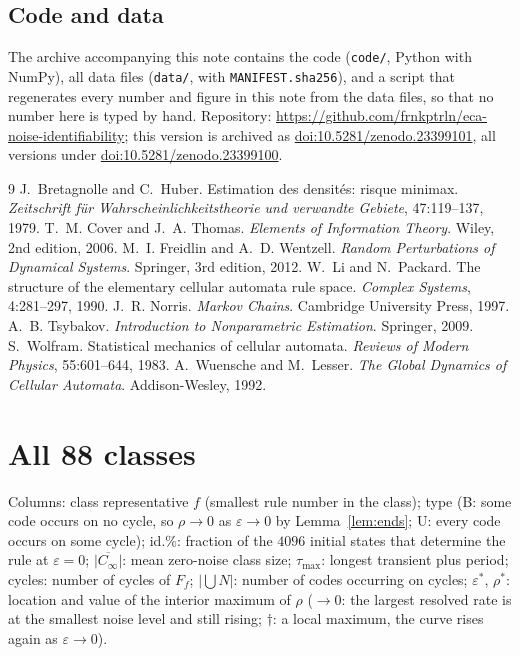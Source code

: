 \documentclass[11pt,a4paper]{article}
\theoremstyle{remark}
\newcommand{\eps}{\varepsilon}
\begin{document}
\subsection*{Code and data}
The archive accompanying this note contains the code (\texttt{code/}, Python with NumPy), all data files (\texttt{data/}, with \texttt{MANIFEST.sha256}), and a script that regenerates every number and figure in this note from the data files, so that no number here is typed by hand. Repository: \url{https://github.com/frnkptrln/eca-noise-identifiability}; this version is archived as \href{https://doi.org/10.5281/zenodo.23399101}{doi:10.5281/zenodo.23399101}, all versions under \href{https://doi.org/10.5281/zenodo.23399100}{doi:10.5281/zenodo.23399100}.

\begin{thebibliography}{9}\small
{} J.~Bretagnolle and C.~Huber. Estimation des densit\'es: risque minimax. \emph{Zeitschrift f\"ur Wahrscheinlichkeitstheorie und verwandte Gebiete}, 47:119--137, 1979.
 T.~M. Cover and J.~A. Thomas. \emph{Elements of Information Theory}. Wiley, 2nd edition, 2006.
 M.~I. Freidlin and A.~D. Wentzell. \emph{Random Perturbations of Dynamical Systems}. Springer, 3rd edition, 2012.
 W.~Li and N.~Packard. The structure of the elementary cellular automata rule space. \emph{Complex Systems}, 4:281--297, 1990.
 J.~R. Norris. \emph{Markov Chains}. Cambridge University Press, 1997.
 A.~B. Tsybakov. \emph{Introduction to Nonparametric Estimation}. Springer, 2009.
 S.~Wolfram. Statistical mechanics of cellular automata. \emph{Reviews of Modern Physics}, 55:601--644, 1983.
 A.~Wuensche and M.~Lesser. \emph{The Global Dynamics of Cellular Automata}. Addison-Wesley, 1992.
\end{thebibliography}

\clearpage
\appendix
\section{All 88 classes}\label{app:table}
\footnotesize\setlength{\tabcolsep}{2.6pt}
Columns: class representative $f$ (smallest rule number in the class); type (B: some code occurs on no cycle, so $\rho\to0$ as $\eps\to0$ by Lemma~\ref{lem:ends}; U: every code occurs on some cycle); id.\%: fraction of the $4096$ initial states that determine the rule at $\eps=0$; $\overline{|C_\infty|}$: mean zero-noise class size; $\tau_{\max}$: longest transient plus period; cycles: number of cycles of $F_f$; $|\bigcup N|$: number of codes occurring on cycles; $\eps^*$, $\rho^*$: location and value of the interior maximum of $\rho$ ($\to0$: the largest resolved rate is at the smallest noise level and still rising; $\dagger$: a local maximum, the curve rises again as $\eps\to0$).

\medskip
{\scriptsize}
\end{document}
